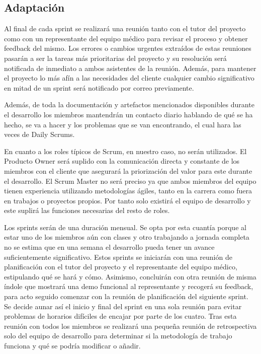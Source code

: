      \subsection{Adaptación}
    Al final de cada sprint se realizará una reunión tanto con el tutor del proyecto como con un representante del equipo médico para revisar el proceso y obtener feedback del mismo. Los errores o cambios urgentes extraídos de estas reuniones pasarán a ser la tareas más prioritarias del proyecto y su resolución será notificada de inmediato a ambos asistentes de la reunión. Además, para mantener el proyecto lo más afín a las necesidades del cliente cualquier cambio significativo en mitad de un sprint será notificado por correo previamente.
    \newline
    
    Además, de toda la documentación y artefactos mencionados disponibles durante el desarrollo los miembros mantendrán un contacto diario hablando de qué se ha hecho, se va a hacer y los problemas que se van encontrando, el cual hara las veces de Daily Scrums.\newline

	En cuanto a los roles típicos de Scrum, en nuestro caso, no serán utilizados. El Producto Owner será suplido con la comunicación directa y constante  de los miembros con el cliente que asegurará la priorización del valor para este durante el desarrollo. El Scrum Master no será preciso ya que ambos miembros del equipo tienen experiencia utilizando metodologías ágiles, tanto en la carrera como fuera en trabajos o proyectos propios. Por tanto solo existirá el equipo de desarrollo y este suplirá las funciones necesarias del resto de roles.\newline

	Los sprints serán de una duración mensual. Se opta por esta cuantía porque al estar uno de los miembros aún con clases y otro trabajando a jornada completa no se estima que en una semana el desarrollo pueda tener un avance suficientemente significativo. Estos sprints se iniciarán con una reunión de planificación con el tutor del proyecto y el representante del equipo médico, estipulando qué se hará y cómo. Asimismo, concluirán con otra reunión de misma índole que mostrará una demo funcional al representante y recogerá su feedback, para acto seguido comenzar con la reunión de planificación del siguiente sprint. Se decide aunar así el inicio y final del sprint en una sola reunión para evitar problemas de horarios difíciles de encajar por parte de los cuatro. Tras esta reunión con todos los miembros se realizará una pequeña reunión de retrospectiva solo del equipo de desarrollo para determinar si la metodología de trabajo funciona y qué se podría modificar o añadir.\newline



